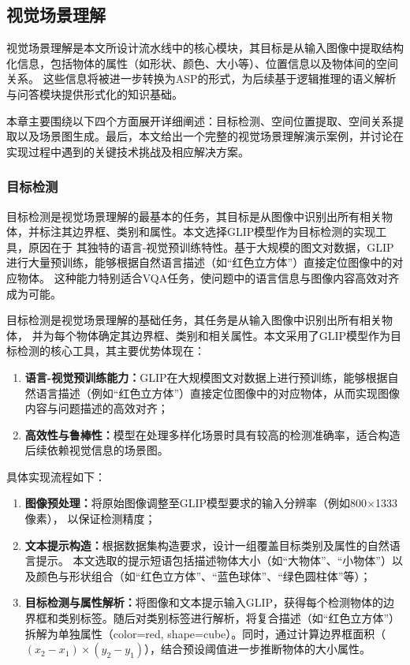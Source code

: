\subsection{视觉场景理解}
视觉场景理解是本文所设计流水线中的核心模块，其目标是从输入图像中提取结构化信息，包括物体的属性（如形状、颜色、大小等）、位置信息以及物体间的空间关系。
这些信息将被进一步转换为ASP的形式，为后续基于逻辑推理的语义解析与问答模块提供形式化的知识基础。

本章主要围绕以下四个方面展开详细阐述：目标检测、空间位置提取、空间关系提取以及场景图生成。最后，本文给出一个完整的视觉场景理解演示案例，并讨论在实现过程中遇到的关键技术挑战及相应解决方案。
\subsubsection{目标检测}
目标检测是视觉场景理解的最基本的任务，其目标是从图像中识别出所有相关物体，并标注其边界框、类别和属性。本文选择GLIP模型作为目标检测的实现工具，原因在于
其独特的语言-视觉预训练特性。基于大规模的图文对数据，GLIP进行大量预训练，能够根据自然语言描述（如“红色立方体”）直接定位图像中的对应物体。
这种能力特别适合VQA任务，使问题中的语言信息与图像内容高效对齐成为可能。

目标检测是视觉场景理解的基础任务，其任务是从输入图像中识别出所有相关物体，
并为每个物体确定其边界框、类别和相关属性。本文采用了GLIP模型作为目标检测的核心工具，其主要优势体现在：
\begin{enumerate}[label=(\arabic*),itemsep=0pt,parsep=0pt] 
\item \textbf{语言-视觉预训练能力：}GLIP在大规模图文对数据上进行预训练，能够根据自然语言描述（例如“红色立方体”）直接定位图像中的对应物体，从而实现图像内容与问题描述的高效对齐； 
\item \textbf{高效性与鲁棒性：}模型在处理多样化场景时具有较高的检测准确率，适合构造后续依赖视觉信息的场景图。 
\end{enumerate}

具体实现流程如下：
\begin{enumerate}[label=(\arabic*),itemsep=0pt] 
\item \textbf{图像预处理：}将原始图像调整至GLIP模型要求的输入分辨率（例如800$\times$1333像素），
以保证检测精度； 
\item \textbf{文本提示构造：}根据数据集构造要求，设计一组覆盖目标类别及属性的自然语言提示。
本文选取的提示短语包括描述物体大小（如“大物体”、“小物体”）以及颜色与形状组合（如“红色立方体”、“蓝色球体”、“绿色圆柱体”等）； 
\item \textbf{目标检测与属性解析：}将图像和文本提示输入GLIP，获得每个检测物体的边界框和类别标签。随后对类别标签进行解析，将复合描述（如“红色立方体”）拆解为单独属性（color=red, shape=cube）。同时，通过计算边界框面积（$(x_2 - x_1)\times(y_2 - y_1)$），结合预设阈值进一步推断物体的大小属性。 
\end{enumerate}

